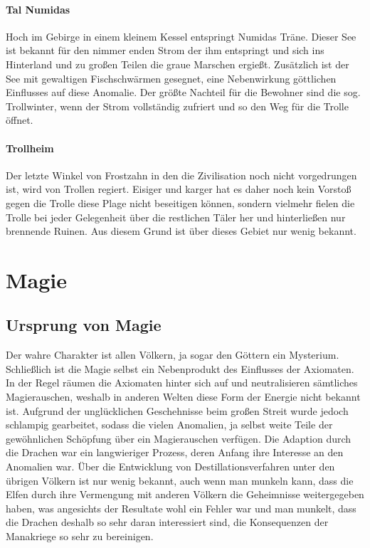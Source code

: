 \documentclass[a4paper,12pt,oneside]{book}
\begin{document}
\subsection{Tal Numidas}
Hoch im Gebirge in einem kleinem Kessel entspringt Numidas Träne. Dieser See ist bekannt für den nimmer enden Strom der ihm entspringt und sich ins Hinterland und zu großen Teilen die graue Marschen ergießt. Zusätzlich ist der See mit gewaltigen Fischschwärmen gesegnet, eine Nebenwirkung göttlichen Einflusses auf diese Anomalie. Der größte Nachteil für die Bewohner sind die sog. Trollwinter, wenn der Strom vollständig zufriert und so den Weg für die Trolle öffnet.
\subsection{Trollheim}
Der letzte Winkel von Frostzahn in den die Zivilisation noch nicht vorgedrungen ist, wird von Trollen regiert. Eisiger und karger hat es daher noch kein Vorstoß gegen die Trolle diese Plage nicht beseitigen können, sondern vielmehr fielen die Trolle bei jeder Gelegenheit über die restlichen Täler her und hinterließen nur brennende Ruinen. Aus diesem Grund ist über dieses Gebiet nur wenig bekannt. 

\part{Magie}
\setcounter{chapter}{0}

\chapter{Ursprung von Magie}
Der wahre Charakter ist allen Völkern, ja sogar den Göttern ein Mysterium. Schließlich ist die Magie selbst ein Nebenprodukt des Einflusses der Axiomaten. In der Regel räumen die Axiomaten hinter sich auf und neutralisieren sämtliches Magierauschen, weshalb in anderen Welten diese Form der Energie nicht bekannt ist. Aufgrund der unglücklichen Geschehnisse beim großen Streit wurde jedoch schlampig gearbeitet, sodass die vielen Anomalien, ja selbst weite Teile der gewöhnlichen Schöpfung über ein Magierauschen verfügen. Die Adaption durch die Drachen war ein langwieriger Prozess, deren Anfang ihre Interesse an den Anomalien war. Über die Entwicklung von Destillationsverfahren unter den übrigen Völkern ist nur wenig bekannt, auch wenn man munkeln kann, dass die  Elfen durch ihre Vermengung mit anderen Völkern die Geheimnisse weitergegeben haben, was angesichts der Resultate wohl ein Fehler war und man munkelt, dass die Drachen deshalb so sehr daran interessiert sind, die Konsequenzen der Manakriege so sehr zu bereinigen.  
\end{document}

